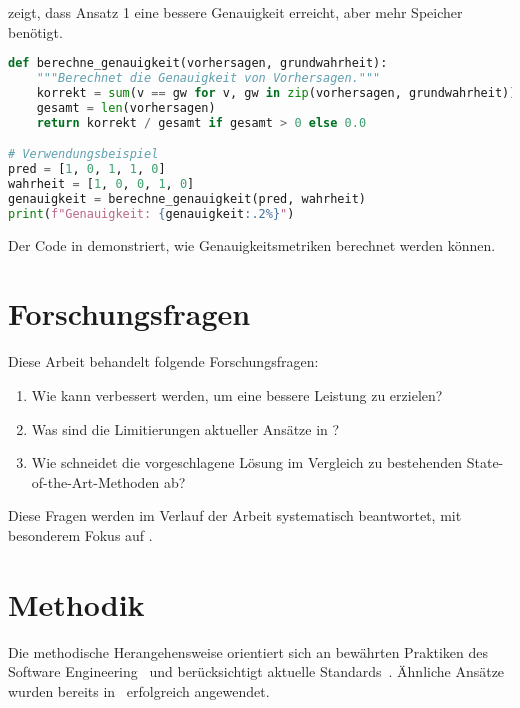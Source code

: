  zeigt, dass Ansatz 1 eine bessere Genauigkeit erreicht, aber mehr Speicher benötigt.

\begin{lstlisting}[language=Python, caption=Beispiel Python-Code, label=lst:example]
def berechne_genauigkeit(vorhersagen, grundwahrheit):
    """Berechnet die Genauigkeit von Vorhersagen."""
    korrekt = sum(v == gw for v, gw in zip(vorhersagen, grundwahrheit))
    gesamt = len(vorhersagen)
    return korrekt / gesamt if gesamt > 0 else 0.0

# Verwendungsbeispiel
pred = [1, 0, 1, 1, 0]
wahrheit = [1, 0, 0, 1, 0]
genauigkeit = berechne_genauigkeit(pred, wahrheit)
print(f"Genauigkeit: {genauigkeit:.2%}")
\end{lstlisting}

Der Code in  demonstriert, wie Genauigkeitsmetriken berechnet werden können.

\section{Forschungsfragen}
\label{sec:research_questions}

Diese Arbeit behandelt folgende Forschungsfragen:

\begin{enumerate}
	\item Wie kann  verbessert werden, um eine bessere Leistung zu erzielen?
	\item Was sind die Limitierungen aktueller Ansätze in ?
	\item Wie schneidet die vorgeschlagene Lösung im Vergleich zu bestehenden State-of-the-Art-Methoden ab?
\end{enumerate}

Diese Fragen werden im Verlauf der Arbeit systematisch beantwortet, mit besonderem Fokus auf .

\section{Methodik}
\label{sec:methodology}

Die methodische Herangehensweise orientiert sich an bewährten Praktiken des Software Engineering~\cite{example_web} und berücksichtigt aktuelle Standards~\cite{example_standard}.
Ähnliche Ansätze wurden bereits in~\cite{example_thesis} erfolgreich angewendet.
